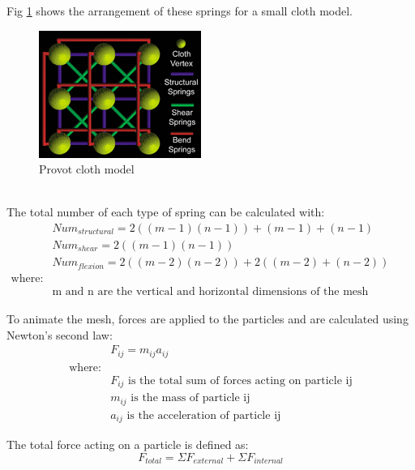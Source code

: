 Fig \ref{fig:provot model} shows the arrangement of these springs for a small cloth model.
\begin{figure}[tp]
   \begin{center}
     \includegraphics{Figures/provot_mesh_structure.png}
   \end{center}
   \caption[Provot cloth model]{Provot cloth model \parencite[2]{Lander2000}}
   \label{fig:provot model}
\end{figure}
\\The total number of each type of spring can be calculated with:
\begin{equation}
\begin{split}
\label{eq:num springs}
  &Num_{structural} = 2((m - 1)(n - 1)) + (m - 1) + (n - 1)
  \\&Num_{shear} = 2((m - 1)(n - 1))
  \\&Num_{flexion} = 2((m - 2)(n - 2)) + 2((m - 2) + (n - 2))
  \\\text{where:}
  \\&\text{m and n are the vertical and horizontal dimensions of the mesh respectively}
  \end{split}
\end{equation}

To animate the mesh, forces are applied to the particles and are calculated using Newton's second law:
\begin{equation}
\begin{split}
\label{eq:newton second law}
  &F_{ij} = m_{ij}a_{ij}
\\\text{where:}
\\&F_{ij}\text{ is the total sum of forces acting on particle ij}
\\&m_{ij}\text{ is the mass of particle ij}
\\&a_{ij}\text{ is the acceleration of particle ij}
\end{split}
\end{equation}

The total force acting on a particle is defined as:
\begin{equation}
\label{eq:total force}
  F_{total} = \Sigma F_{external} + \Sigma F_{internal}
\end{equation}

